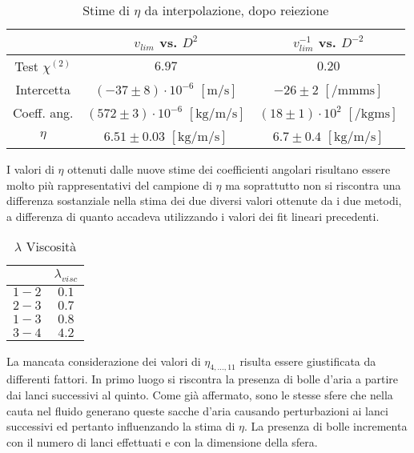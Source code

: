 \documentclass[a4paper,11pt,oneside]{article}
\begin{document}
\begin{table}[h!]
    \centering
    \begin{tabular}{|c|c|c|}
        \hline
        &$v_{lim}$ vs. $D^{2}$ &$v_{lim}^{-1}$ vs. $D^{-2}$ \\\hline
        \rowcolor[rgb]{0.85,0.85,0.85}Test $\chi^{(2)}$ & $6.97$ & $ 0.20$\\\hline
        Intercetta & $(-37 \pm 8)\cdot10^{-6}$ $[\si{\metre\per\second}]$ & $ -26 \pm 2$ $[\si{\per\milli\metre\milli\second}]$\\\hline
        \rowcolor[rgb]{0.85,0.85,0.85}Coeff. ang. & $(572 \pm 3)\cdot10^{-6}$ $[\si{\kilo\gram\per\metre\per\second}]$ & $(18 \pm 1)\cdot10^{2}$ $[\si{\per\kilo\gram\metre\second}]$\\\hline
        $\eta$ & $6.51 \pm 0.03$ $[\si{\kilo\gram\per\metre\per\second}]$ & $ 6.7 \pm 0.4$ $[\si{\kilo\gram\per\metre\per\second}]$ \\\hline
        \end{tabular}
    \caption{Stime di $\eta$ da interpolazione, dopo reiezione}
    \label{tab:eta_interpolazione}
\end{table}

I valori di $\eta$ ottenuti dalle nuove stime dei coefficienti angolari risultano essere molto più rappresentativi del campione di $\eta$ ma soprattutto non si riscontra una differenza sostanziale nella stima dei due diversi valori ottenute da i due metodi, a differenza di quanto accadeva utilizzando i valori dei fit lineari precedenti.\newline

\begin{wraptable}{r}{4cm}
    \centering
    \begin{tabular}{|c|c|}
        \hline
        & $\lambda_{visc}$\\ \hline
        {\rowcolor[rgb]{0.85,0.85,0.85}}$1-2$ & $0.1$\\ \hline
        $2-3$ & $0.7$\\ \hline
        {\rowcolor[rgb]{0.85,0.85,0.85}}$1-3$ & $0.8$\\ \hline
        $3-4$ & $4.2$\\ \hline
    \end{tabular}
    \caption{$\lambda$ Viscosità}
    \label{tab:comp_eta}
\end{wraptable}

La mancata considerazione dei valori di $\eta_{4,...,11}$ risulta essere giustificata da differenti fattori.
In primo luogo si riscontra la presenza di bolle d'aria a partire dai lanci successivi al quinto. Come già affermato, sono le stesse sfere che nella cauta nel fluido generano queste sacche d'aria causando perturbazioni ai lanci successivi ed pertanto influenzando la stima di $\eta$. La presenza di bolle incrementa con il numero di lanci effettuati e con la dimensione della sfera.\newline
\end{document}
